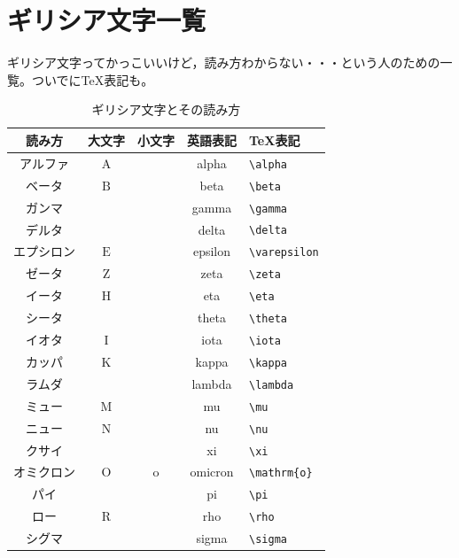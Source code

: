 \documentclass{ltjsbook}
\begin{document}
\VerbatimFootnotes
\chapter{ギリシア文字一覧}
\label{Greeks}
ギリシア文字ってかっこいいけど，読み方わからない・・・という人のための一覧。ついでに\TeX 表記も。
\begin{table}[ht]
	\centering
	\caption{ギリシア文字とその読み方}
	\begin{tabular}{ccccl}
		読み方   & 大文字           & 小文字          & 英語表記    & \TeX 表記            \\\hline
		アルファ  & $\mathrm{A} $ & \alpha       & alpha   & \verb|\alpha|      \\
		ベータ   & $\mathrm{B}$  & \beta        & beta    & \verb|\beta|       \\
		ガンマ   & \Gamma        & \gamma       & gamma   & \verb|\gamma|      \\
		デルタ   & \Delta        & \delta       & delta   & \verb|\delta|      \\
		エプシロン & $\mathrm{E}$  & \varepsilon  & epsilon & \verb|\varepsilon| \\
		ゼータ   & $\mathrm{Z}$  & \zeta        & zeta    & \verb|\zeta|       \\
		イータ   & $\mathrm{H}$  & \eta         & eta     & \verb|\eta|        \\
		シータ   & \Theta        & \theta       & theta   & \verb|\theta|      \\
		イオタ   & $\mathrm{I}$  & \iota        & iota    & \verb|\iota|       \\
		カッパ   & $\mathrm{K}$  & \kappa       & kappa   & \verb|\kappa|      \\
		ラムダ   & \Lambda       & \lambda      & lambda  & \verb|\lambda|     \\
		ミュー   & $\mathrm{M}$  & \mu          & mu      & \verb|\mu|         \\
		ニュー   & $\mathrm{N}$  & \nu          & nu      & \verb|\nu|         \\
		クサイ   & \Xi           & \xi          & xi      & \verb|\xi|         \\
		オミクロン & $\mathrm{O}$  & $\mathrm{o}$ & omicron & \verb|\mathrm{o}|  \\
		パイ    & \Pi           & \pi          & pi      & \verb|\pi|         \\
		ロー    & $\mathrm{R}$  & \rho         & rho     & \verb|\rho|        \\
		シグマ   & \Sigma        & \sigma       & sigma   & \verb|\sigma|      \\

\end{tabular}
\end{table}
\end{document}
